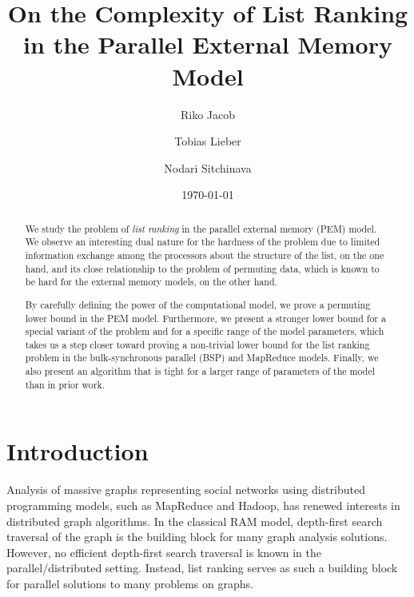 \documentclass[envcountsame]{llncs}
\begin{document}
 

\pagestyle{plain}
\title{On the Complexity of List Ranking in the Parallel External Memory Model}

\author{
  Riko Jacob \and
  Tobias Lieber  \and
  Nodari Sitchinava 
}
\date{\today}

\maketitle


\begin{abstract}
We study the problem of {\em list ranking} in the parallel external memory (PEM) model. 
We observe an interesting dual nature for the hardness of the problem due to limited information exchange among the processors about the structure of the list, on the one hand, and its close relationship to the problem of permuting data, which is known to be hard for the external memory models, on the other hand. 

By carefully defining the power of the computational model, we prove a permuting lower bound in the PEM model.
Furthermore, we present a stronger  lower bound for a special variant of the problem and for a specific range of the model parameters, which takes us a step closer toward proving a non-trivial lower bound for the list ranking problem in the bulk-synchronous parallel (BSP) and MapReduce models.
Finally, we also present an algorithm that is tight for a larger range of parameters of the model than in prior work.





\end{abstract}



\section{Introduction}
\label{sectionIntroduction}
Analysis of massive graphs representing social networks using distributed programming models, such as MapReduce and Hadoop, has renewed interests in distributed graph algorithms. 
In the classical RAM model, depth-first search traversal of the graph is the building block for many graph analysis solutions. 
However, no efficient depth-first search traversal is known in the parallel/distributed setting. 
Instead, list ranking serves as such a building block for parallel solutions to many problems on graphs. 
\end{document}
